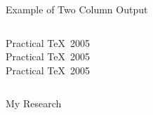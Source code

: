 \documentclass[table]{beamer}
\begin{document}
\begin{frame}{Example of Two Column Output}
    \begin{columns}[c]
        \column{1.5in}
            Practical \TeX\ 2005\\
            Practical \TeX\ 2005\\
            Practical \TeX\ 2005
        \column{1.5in}
    \end{columns}
\end{frame}


\begin{frame}{My Research}
\end{frame}
\end{document}
